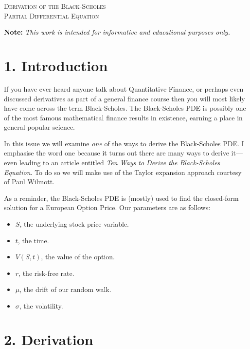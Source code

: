 \documentclass[11pt]{article}
\begin{document}

\begin{tcolorbox}
\begin{center}
    \large
    \textsc{Derivation of the Black-Scholes \\ Partial Differential Equation}
\end{center}
\end{tcolorbox}

\begin{center}
\textbf{Note:} \textit{This work is intended for informative and educational purposes only.}
\end{center}

\section*{1. Introduction}
If you have ever heard anyone talk about Quantitative Finance, or perhaps even discussed derivatives as part of a general finance course then you will most likely have come across the term Black-Scholes. The Black-Scholes PDE is possibly one of the most famous mathematical finance results in existence, earning a place in general popular science. 

In this issue we will examine \textit{one} of the ways to derive the Black-Scholes PDE. I emphasise the word one because it turns out there are many ways to derive it––even leading to an article entitled \textit{Ten Ways to Derive the Black-Scholes Equation}. To do so we will make use of the Taylor expansion approach courtesy of Paul Wilmott.

As a reminder, the Black-Scholes PDE is (mostly) used to find the closed-form solution for a European Option Price. Our parameters are as follows:
\begin{itemize}
    \item $S$, the underlying stock price variable.
    \item $t$, the time. 
    \item $V(S,t)$, the value of the option.
    \item $r$, the risk-free rate.
    \item $\mu$, the drift of our random walk.
    \item $\sigma$, the volatility. 
\end{itemize}

\section*{2. Derivation}
\end{document}
